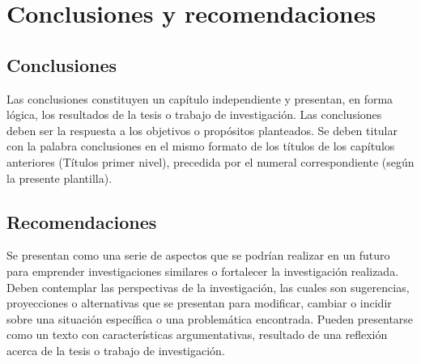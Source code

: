 \chapter{Conclusiones y recomendaciones}
\section{Conclusiones}
Las conclusiones constituyen un capítulo independiente y presentan, en forma lógica, los resultados de la tesis  o trabajo de investigación. Las conclusiones deben ser la respuesta a los objetivos o propósitos planteados. Se deben titular con la palabra conclusiones en el mismo formato de los títulos de los capítulos anteriores (Títulos primer nivel), precedida por el numeral correspondiente (según la presente plantilla).\\

\section{Recomendaciones}
Se presentan como una serie de aspectos que se podrían realizar en un futuro para emprender investigaciones similares o fortalecer la investigación realizada. Deben contemplar las perspectivas de la investigación, las cuales son sugerencias, proyecciones o alternativas que se presentan para modificar, cambiar o incidir sobre una situación específica o una problemática encontrada. Pueden presentarse como un texto con características argumentativas, resultado de una reflexión acerca de la tesis o trabajo de investigación.\\